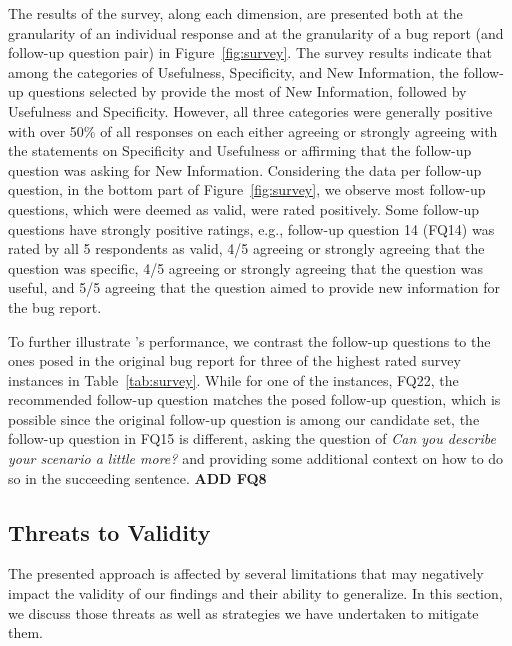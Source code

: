 The results of the survey, along each dimension, are presented both at the granularity of an individual response and at the granularity of a bug report (and follow-up question pair) in Figure~\ref{fig:survey}. The survey results indicate that among the categories of Usefulness, Specificity, and New Information, the follow-up questions selected by \evpi provide the most of New Information, followed by Usefulness and Specificity. However, all three categories were generally positive with over 50\% of all responses on each either agreeing or strongly agreeing with the statements on Specificity and Usefulness or affirming that the follow-up question was asking for New Information. Considering the data per follow-up question, in the bottom part of Figure~\ref{fig:survey}, we observe most follow-up questions, which were deemed as valid, were rated positively.  Some follow-up questions have strongly positive ratings, e.g., follow-up question 14 (FQ14) was rated by all 5 respondents as valid, 4/5 agreeing or strongly agreeing that the question was specific, 4/5 agreeing or strongly agreeing that the question was useful, and 5/5 agreeing that the question aimed to provide new information for the bug report.

To further illustrate \evpi's performance, we contrast the \evpi follow-up questions to the ones posed in the original bug report for three of the highest rated survey instances in Table~\ref{tab:survey}. While for one of the instances, FQ22, the recommended follow-up question matches the posed follow-up question, which is possible since the original follow-up question is among our candidate set, the follow-up question in FQ15 is different, asking the question of {\em Can you describe your scenario a little more?} and providing some additional context on how to do so in the succeeding sentence. {\bf ADD FQ8}




\subsection{Threats to Validity}
The presented approach is affected by several limitations that may negatively impact the validity of our findings and their ability to generalize. In this section, we discuss those threats as well as strategies we have undertaken to mitigate them.

